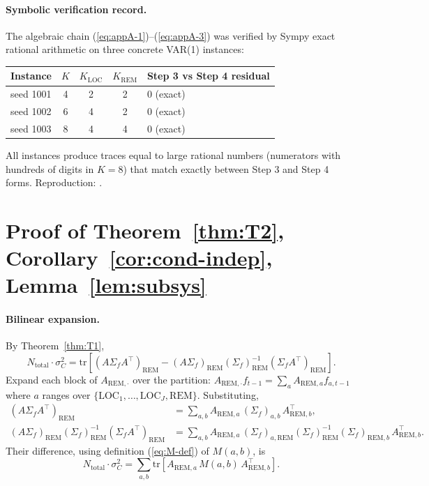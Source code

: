 \documentclass[11pt,letterpaper]{article}
\theoremstyle{remark}
\newcommand{\REM}{\mathrm{REM}}
\newcommand{\LOC}{\mathrm{LOC}}
\newcommand{\Sigmaf}{\Sigma_f}
\newcommand{\Ntot}{N_{\mathrm{total}}}
\newcommand{\sigC}{\sigma^2_C}
\newcommand{\trace}{\mathrm{tr}}
\begin{document}
\paragraph{Symbolic verification record.} The algebraic chain (\ref{eq:appA-1})--(\ref{eq:appA-3}) was verified by Sympy exact rational arithmetic on three concrete VAR(1) instances:
\begin{center}
\begin{tabular}{lcccl}
\toprule
Instance & $K$ & $K_\LOC$ & $K_\REM$ & Step 3 vs Step 4 residual \\
\midrule
seed 1001 & 4 & 2 & 2 & $0$ (exact) \\
seed 1002 & 6 & 4 & 2 & $0$ (exact) \\
seed 1003 & 8 & 4 & 4 & $0$ (exact) \\
\bottomrule
\end{tabular}
\end{center}
All instances produce traces equal to large rational numbers (numerators with hundreds of digits in $K = 8$) that match exactly between Step 3 and Step 4 forms. Reproduction: .

\section{Proof of Theorem~\ref{thm:T2}, Corollary~\ref{cor:cond-indep}, Lemma~\ref{lem:subsys}}\label{app:B}

\paragraph{Bilinear expansion.} By Theorem~\ref{thm:T1},
\begin{equation*}
\Ntot \cdot \sigC = \trace\!\left[(A \Sigmaf A^\top)_\REM - (A \Sigmaf)_\REM (\Sigmaf)_\REM^{-1} (\Sigmaf A^\top)_\REM\right].
\end{equation*}
Expand each block of $A_{\REM, \cdot}$ over the partition: $A_{\REM, \cdot} f_{t-1} = \sum_a A_{\REM, a} f_{a, t-1}$ where $a$ ranges over $\{\LOC_1, \ldots, \LOC_J, \REM\}$. Substituting,
\begin{align*}
(A \Sigmaf A^\top)_\REM &= \sum_{a, b} A_{\REM, a} \, (\Sigmaf)_{a, b} \, A_{\REM, b}^\top, \\
(A \Sigmaf)_\REM (\Sigmaf)_\REM^{-1} (\Sigmaf A^\top)_\REM &= \sum_{a, b} A_{\REM, a} \, (\Sigmaf)_{a, \REM} (\Sigmaf)_\REM^{-1} (\Sigmaf)_{\REM, b} \, A_{\REM, b}^\top.
\end{align*}
Their difference, using definition (\ref{eq:M-def}) of $M(a, b)$, is
\begin{equation}\label{eq:appB-bilinear}
\Ntot \cdot \sigC = \sum_{a, b} \trace\!\left[A_{\REM, a} \, M(a, b) \, A_{\REM, b}^\top\right].
\end{equation}
\end{document}
